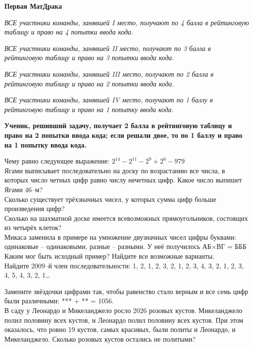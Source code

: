 \centerline{\bf \Huge Первая МатДрака}

\textit{ВСЕ участники команды, занявшей I место, получают по 4 балла в рейтинговую таблицу и право на 4 попытки ввода кода.}

\textit{ВСЕ участники команды, занявшей II место, получают по 3 балла в рейтинговую таблицу и право на 3 попытки ввода кода.}

\textit{ВСЕ участники команды, занявшей III место, получают по 2 балла в рейтинговую таблицу и право на 2 попытки ввода кода.}

\textit{ВСЕ участники команды, занявшей IV место, получают по 1 баллу в рейтинговую таблицу и право на 1 попытку ввода кода.}

\textbf{Ученик, решивший задачу, получает 2 балла в рейтинговую таблицу и право на 2 попытки ввода кода; если решали двое, то по 1 баллу и право на 1 попытку ввода кода.}

 Чему равно следующее выражение:  $2^{14}-2^{11}-2^{9}+2^{6}-979$\\

 Ягами выписывает последовательно на доску по возрастанию все числа, в которых число четных цифр равно числу нечетных цифр. Какое число выпишет Ягами 46–м?\\

 Сколько существует трёхзначных чисел, у которых сумма цифр больше произведения цифр?\\


 Сколько на шахматной доске имеется всевозможных прямоугольников, состоящих из четырёх клеток?\\

 Микаса заменила в примере на умножение двузначных чисел цифры буквами: одинаковые – одинаковыми, разные – разными. У неё получилось АБ$\times$ВГ = БББ Каким мог быть исходный пример? Найдите все возможные варианты.\\


 Найдите 2009–й член последовательности: 1, 2, 1, 2, 3, 2, 1, 2, 3, 4, 3, 2, 1, 2, 3, 4, 5, 4, 3, 2, 1…



 Замените звёздочки цифрами так, чтобы равенство стало верным
и все семь цифр были различными: *** + ** = 1056.\\




 В саду у Леонардо и Микеланджело росло 2026 розовых кустов. Микеланджело
полил половину всех кустов, и Леонардо полил половину всех кустов. При этом оказалось, что ровно
19 кустов, самых красивых, были политы и Леонардо, и Микеланджело. Сколько розовых кустов остались
не политыми?\\


